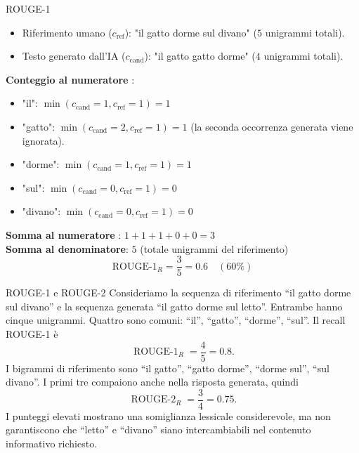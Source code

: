 \begin{example}{ROUGE-1}
    \begin{itemize}
        \item Riferimento umano ($c_{\text{ref}}$): "il gatto dorme sul divano" ($5$ unigrammi totali). 
        \item Testo generato dall'IA ($c_{\text{cand}}$): "il gatto gatto dorme" ($4$ unigrammi totali).
    \end{itemize}
    \textbf{Conteggio al numeratore} : 
    \begin{itemize}
        \item "il": $\min(c_{\text{cand}}=1, c_{\text{ref}}=1) = 1$ 
        \item "gatto": $\min(c_{\text{cand}}=2, c_{\text{ref}}=1) = 1$ (la seconda occorrenza generata viene ignorata).
        \item "dorme": $\min(c_{\text{cand}}=1, c_{\text{ref}}=1) = 1$
        \item "sul": $\min(c_{\text{cand}}=0, c_{\text{ref}}=1) = 0$
        \item "divano": $\min(c_{\text{cand}}=0, c_{\text{ref}}=1) = 0$
    \end{itemize}
    \textbf{Somma al numeratore} : $1 + 1 + 1 + 0 + 0 = 3$ \\
    \textbf{Somma al denominatore}: $5$ (totale unigrammi del riferimento)   $$\text{ROUGE-1}_R = \frac{3}{5} = 0.6 \quad (60\%)$$ 
\end{example}

\begin{example}{ROUGE-1 e ROUGE-2}
Consideriamo la sequenza di riferimento ``il gatto dorme sul divano'' e la sequenza generata ``il gatto dorme sul letto''. Entrambe hanno cinque unigrammi. Quattro sono comuni: ``il'', ``gatto'', ``dorme'', ``sul''. Il recall ROUGE-1 è
\begin{equation}
\operatorname{ROUGE\text{-}1}_R=\frac45=0.8.
\end{equation}
I bigrammi di riferimento sono ``il gatto'', ``gatto dorme'', ``dorme sul'', ``sul divano''. I primi tre compaiono anche nella risposta generata, quindi
\begin{equation}
\operatorname{ROUGE\text{-}2}_R=\frac34=0.75.
\end{equation}
I punteggi elevati mostrano una somiglianza lessicale considerevole, ma non garantiscono che ``letto'' e ``divano'' siano intercambiabili nel contenuto informativo richiesto.
\end{example}

